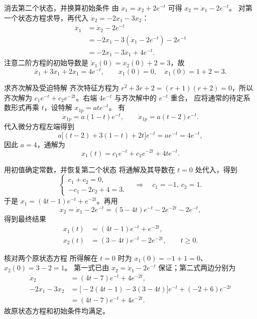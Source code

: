 \documentclass[11pt]{article}
\begin{document}
\begin{solution}
\begin{proofstep}{消去第二个状态，并换算初始条件}
由 $\dot x_1=x_2+2e^{-t}$ 可得 $x_2=\dot x_1-2e^{-t}$。
对第一个状态方程求导，再代入 $\dot x_2=-2x_1-3x_2$：
\begin{align*}
\ddot x_1&=\dot x_2-2e^{-t}\\
&=-2x_1-3(\dot x_1-2e^{-t})-2e^{-t}\\
&=-2x_1-3\dot x_1+4e^{-t}.
\end{align*}
注意二阶方程的初始导数是 $\dot x_1(0)=x_2(0)+2=3$，故
\[
\ddot x_1+3\dot x_1+2x_1=4e^{-t},\qquad
x_1(0)=0,\quad \dot x_1(0)=1+2=3.
\]
\end{proofstep}
\begin{proofstep}{求齐次解及受迫特解}
齐次特征方程为 $r^2+3r+2=(r+1)(r+2)=0$，所以齐次解为
$c_1e^{-t}+c_2e^{-2t}$。右端 $4e^{-t}$ 与齐次解中的 $e^{-t}$ 重合，
应将通常的待定系数形式再乘 $t$，设特解 $x_{1p}=at e^{-t}$。
有
\[
\dot x_{1p}=a(1-t)e^{-t},\qquad
\ddot x_{1p}=a(t-2)e^{-t}.
\]
代入微分方程左端得到
\[
a\bigl[(t-2)+3(1-t)+2t\bigr]e^{-t}=ae^{-t}=4e^{-t},
\]
因此 $a=4$，通解为
\[
x_1(t)=c_1e^{-t}+c_2e^{-2t}+4te^{-t}.
\]
\end{proofstep}
\begin{proofstep}{用初值确定常数，并恢复第二个状态}
将通解及其导数在 $t=0$ 处代入，得到
\[
\begin{cases}c_1+c_2=0,\\-c_1-2c_2+4=3.\end{cases}
\quad\Longrightarrow\quad c_1=-1,\ c_2=1.
\]
于是 $x_1=(4t-1)e^{-t}+e^{-2t}$。再用
\[
x_2=\dot x_1-2e^{-t}=(5-4t)e^{-t}-2e^{-2t}-2e^{-t},
\]
得到最终结果
\[
\boxed{\begin{aligned}
x_1(t)&=(4t-1)e^{-t}+e^{-2t},\\
x_2(t)&=(3-4t)e^{-t}-2e^{-2t},\qquad t\geq0.
\end{aligned}}
\]
\end{proofstep}
\begin{proofstep}{核对两个原状态方程}
所得解在 $t=0$ 时为 $x_1(0)=-1+1=0$、$x_2(0)=3-2=1$。
第一式已由 $x_2=\dot x_1-2e^{-t}$ 保证；第二式两边分别为
\begin{align*}
\dot x_2&=(4t-7)e^{-t}+4e^{-2t},\\
-2x_1-3x_2&=\bigl[-2(4t-1)-3(3-4t)\bigr]e^{-t}
 +(-2+6)e^{-2t}\\
&=(4t-7)e^{-t}+4e^{-2t}.
\end{align*}
故原状态方程和初始条件均满足。
\end{proofstep}
\end{solution}
\end{document}
